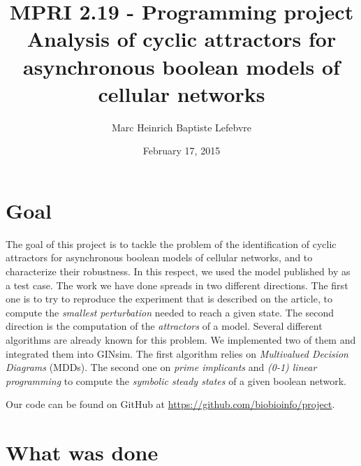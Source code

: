 \documentclass[a4paper,11pt]{article}
\author{Marc Heinrich \hspace{20mm} Baptiste Lefebvre}
\title{MPRI 2.19 - Programming project \\ Analysis of cyclic attractors for \\ asynchronous boolean models of cellular networks}
\date{February 17, 2015}
\begin{document}
\maketitle


\section{Goal}




The goal of this project is to tackle the problem of the identification of
cyclic attractors for asynchronous boolean models of cellular networks, and to
characterize their robustness. In this respect, we used the model published by
\cite{Bonzanni} as a test case. The work we have done spreads in two different
directions. The first one is to try to reproduce the experiment that is
described on the article, to compute the \emph{smallest perturbation} needed to
reach a given state. The second direction is the computation of the
\emph{attractors} of a model. Several different algorithms are already known for
this problem. We implemented two of them and integrated them into GINsim. The
first algorithm relies on \emph{Multivalued Decision Diagrams} (MDDs). The
second one on \emph{prime implicants} and \emph{(0-1) linear programming} to
compute the \emph{symbolic steady states} of a given boolean network.

Our code can be found on GitHub at
\href{https://github.com/biobioinfo/project}{https://github.com/biobioinfo/project}.


\section{What was done}


\end{document}
